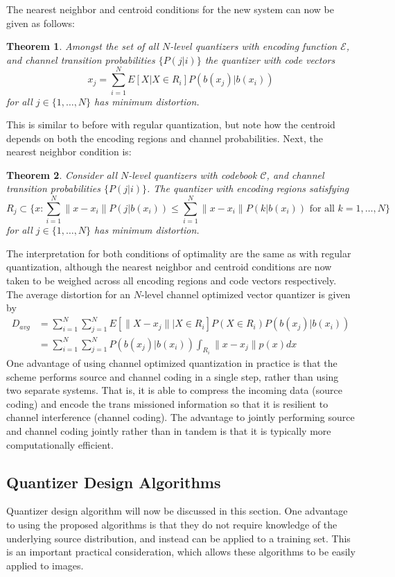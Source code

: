 \documentclass[10pt]{article}
\newtheorem{theorem}{Theorem}[section]
\begin{document}
The nearest neighbor and centroid conditions for the new system can now be given as follows:
\begin{theorem}
Amongst the set of all $N$-level quantizers with encoding function $\mathcal{E}$, and channel transition probabilities $\{P(j|i)\}$ the quantizer with code vectors
\begin{equation}
  x_j = \sum_{i=1}^N E[X | X \in R_i]P(b(x_j)|b(x_i))
\end{equation}
for all $j \in \{1,\ldots,N\}$ has minimum distortion.
\end{theorem}
This is similar to before with regular quantization, but note how the centroid depends on both the encoding regions and channel probabilities. Next, the nearest neighbor condition is:
\begin{theorem}
Consider all $N$-level quantizers with codebook $\mathcal{C}$, and channel transition probabilities $\{P(j|i)\}$. The quantizer with encoding regions satisfying
\begin{equation}
R_j \subset \{x : \sum_{i=1}^N \| x - x_i \|P(j|b(x_i)) \le \sum_{i=1}^N \| x - x_i \|P(k|b(x_i)) \text{ for all } k = 1,\ldots,N \}
\end{equation}
for all $j \in \{1,\ldots,N\}$ has minimum distortion.
\end{theorem}
The interpretation for both conditions of optimality are the same as with regular quantization, although the nearest neighbor and centroid conditions are now taken to be weighed across all encoding regions and code vectors respectively. The average distortion for an $N$-level channel optimized vector quantizer is given by
\begin{align}
D_{avg} &= \sum_{i=1}^{N} \sum_{j=1}^{N} E[ \|X - x_j\| | X \in R_i] P(X \in R_i) P(b(x_j)|b(x_i))\\
&= \sum_{i=1}^{N} \sum_{j=1}^{N} P(b(x_j)|b(x_i)) \int_{R_i} \|x - x_j\| p(x) dx
\end{align}
One advantage of using channel optimized quantization in practice is that the scheme performs source and channel coding in a single step, rather than using two separate systems. That is, it is able to compress the incoming data (source coding) and encode the trans missioned information so that it is resilient to channel interference (channel coding). The advantage to jointly performing source and channel coding jointly rather than in tandem is that it is typically more computationally efficient.

\subsection{Quantizer Design Algorithms}
\label{sec:quant_design_algos}
Quantizer design algorithm will now be discussed in this section. One advantage to using the proposed algorithms is that they do not require knowledge of the underlying source distribution, and instead can be applied to a training set. This is an important practical consideration, which allows these algorithms to be easily applied to images.
\end{document}
